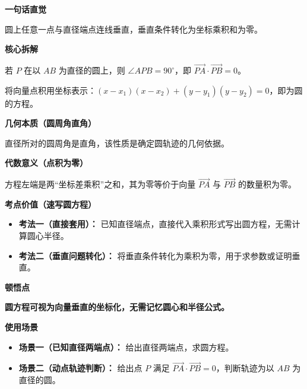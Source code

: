 \begin{explanationbox}
	\textbf{\textcolor{CExplanation}{一句话直觉}}

	圆上任意一点与直径端点连线垂直，垂直条件转化为坐标乘积和为零。

	\medskip
	\textbf{\textcolor{CExplanation}{核心拆解}}
	\begin{description}[style=nextline, leftmargin=2.8em, labelsep=0.5em, itemsep=0.45em]
		\item[\textbf{要点一（向量垂直条件）：}] 若 $P$ 在以 $AB$ 为直径的圆上，则 $\angle APB = 90^\circ$，即 $\overrightarrow{PA}\cdot\overrightarrow{PB}=0$。
		\item[\textbf{要点二（坐标乘积结构）：}] 将向量点积用坐标表示：$(x-x_1)(x-x_2)+(y-y_1)(y-y_2)=0$，即为圆的方程。
	\end{description}

	\medskip
	\textbf{\textcolor{CExplanation}{几何本质（圆周角直角）}}

	直径所对的圆周角是直角，该性质是确定圆轨迹的几何依据。

	\medskip
	\textbf{\textcolor{CExplanation}{代数意义（点积为零）}}

	方程左端是两“坐标差乘积”之和，其为零等价于向量 $\overrightarrow{PA}$ 与 $\overrightarrow{PB}$ 的数量积为零。

	\medskip
	\textbf{\textcolor{CExplanation}{考点价值（速写圆方程）}}
	\begin{itemize}[leftmargin=*, itemsep=0.5em, topsep=0.4em]
		\item \textbf{考法一（直接套用）：} 已知直径端点，直接代入乘积形式写出圆方程，无需计算圆心半径。
		\item \textbf{考法二（垂直问题转化）：} 将垂直条件转化为乘积为零，用于求参数或证明垂直。
	\end{itemize}

	\medskip
	\textbf{\textcolor{CExplanation}{顿悟点}}

	\textbf{圆方程可视为向量垂直的坐标化，无需记忆圆心和半径公式。}

	\medskip
	\textbf{\textcolor{CExplanation}{使用场景}}
	\begin{itemize}[leftmargin=*, itemsep=0.5em, topsep=0.4em]
		\item \textbf{场景一（已知直径两端点）：} 给出直径两端点，求圆方程。
		\item \textbf{场景二（动点轨迹判断）：} 给出点 $P$ 满足 $\overrightarrow{PA}\cdot\overrightarrow{PB}=0$，判断轨迹为以 $AB$ 为直径的圆。
	\end{itemize}
\end{explanationbox}
